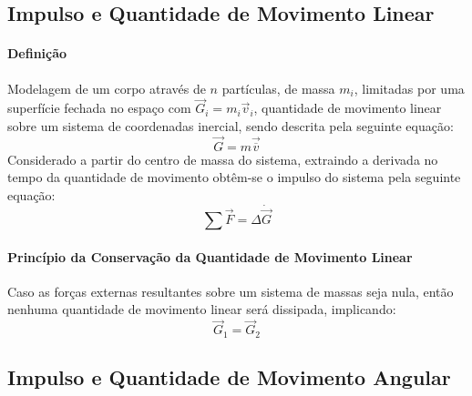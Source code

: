 \documentclass{article}
\begin{document}
        \subsection{Impulso e Quantidade de Movimento Linear}
            \paragraph{Definição}Modelagem de um corpo através de $n$ partículas, de massa $m_{i}$, limitadas por uma superfície fechada no espaço com $\vec{G}_{i} = m_{i} \vec{v}_{i}$, quantidade de movimento linear sobre um sistema de coordenadas inercial, sendo descrita pela seguinte equação:
                \begin{equation}
                    \boxed{
                        \vec{G} = m \vec{\overline{v}}
                    }
                \end{equation}
            Considerado a partir do centro de massa do sistema, extraindo a derivada no tempo da quantidade de movimento obtêm-se o impulso do sistema pela seguinte equação:
                \begin{equation}
                    \boxed{
                        \sum\vec{F} = \Delta\dot{\vec{G}}
                    }
                \end{equation}

            \paragraph{Princípio da Conservação da Quantidade de Movimento Linear}Caso as forças externas resultantes sobre um sistema de massas seja nula, então nenhuma quantidade de movimento linear será dissipada, implicando:
                \begin{equation}
                    \boxed{
                        \vec{G}_{1} = \vec{G}_{2}
                    }
                \end{equation}

        \subsection{Impulso e Quantidade de Movimento Angular}
\end{document}
